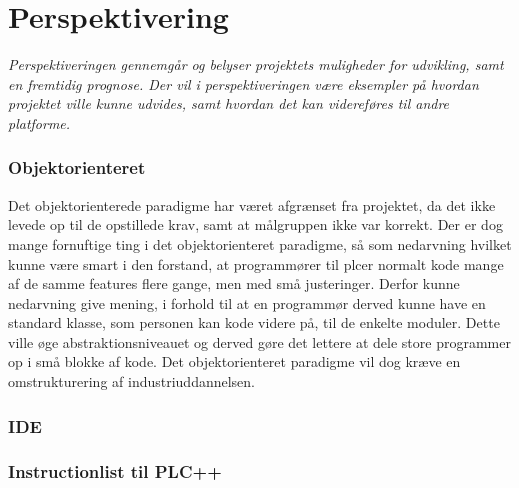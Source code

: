 \chapter{Perspektivering}
\label{sec:Perspektivering}
\textit{Perspektiveringen gennemgår og belyser projektets muligheder for udvikling, samt en fremtidig prognose.
Der vil i perspektiveringen være eksempler på hvordan projektet ville kunne udvides, samt hvordan det kan videreføres til andre platforme.
}

\subsection*{Objektorienteret}
Det objektorienterede paradigme har været afgrænset fra projektet, da det ikke levede op til de opstillede krav, samt at målgruppen ikke var korrekt. 
Der er dog mange fornuftige ting i det objektorienteret paradigme, så som nedarvning hvilket kunne være smart i den forstand, at programmører til \gls{plc}er normalt kode mange af de samme features flere gange, men med små justeringer.
Derfor kunne nedarvning give mening, i forhold til at en programmør derved kunne have en standard klasse, som personen kan kode videre på, til de enkelte moduler.
Dette ville øge abstraktionsniveauet og derved gøre det lettere at dele store programmer op i små blokke af kode.
Det objektorienteret paradigme vil dog kræve en omstrukturering af industriuddannelsen.


\subsection*{IDE}

\subsection*{Instructionlist til PLC++}
